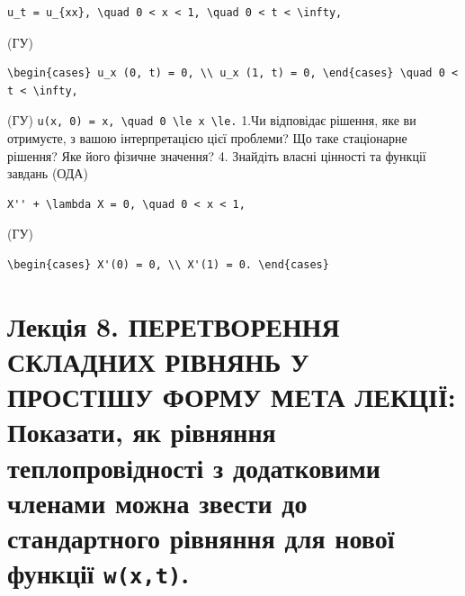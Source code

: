 \documentclass[
  ukrainian,
]{article}
\begin{document}
\begin{verbatim}
u_t = u_{xx}, \quad 0 < x < 1, \quad 0 < t < \infty,
\end{verbatim}

(ГУ)

\begin{verbatim}
\begin{cases} u_x (0, t) = 0, \\ u_x (1, t) = 0, \end{cases} \quad 0 < t < \infty,
\end{verbatim}

(ГУ)
\texttt{u(x,\ 0)\ =\ x,\ \textbackslash{}quad\ 0\ \textbackslash{}le\ x\ \textbackslash{}le.}
1.Чи відповідає рішення, яке ви отримуєте, з вашою інтерпретацією цієї
проблеми? Що таке стаціонарне рішення? Яке його фізичне значення? 4.
Знайдіть власні цінності та функції завдань (ОДА)

\begin{verbatim}
X'' + \lambda X = 0, \quad 0 < x < 1,
\end{verbatim}

(ГУ)

\begin{verbatim}
\begin{cases} X'(0) = 0, \\ X'(1) = 0. \end{cases}
\end{verbatim}

\section{\texorpdfstring{Лекція 8. ПЕРЕТВОРЕННЯ СКЛАДНИХ РІВНЯНЬ У
ПРОСТІШУ ФОРМУ МЕТА ЛЕКЦІЇ: Показати, як рівняння теплопровідності з
додатковими членами можна звести до стандартного рівняння для нової
функції
\texttt{w(x,t)}.}{Лекція 8. ПЕРЕТВОРЕННЯ СКЛАДНИХ РІВНЯНЬ У ПРОСТІШУ ФОРМУ МЕТА ЛЕКЦІЇ: Показати, як рівняння теплопровідності з додатковими членами можна звести до стандартного рівняння для нової функції w(x,t).}}\label{ux43bux435ux43aux446ux456ux44f-8.-ux43fux435ux440ux435ux442ux432ux43eux440ux435ux43dux43dux44f-ux441ux43aux43bux430ux434ux43dux438ux445-ux440ux456ux432ux43dux44fux43dux44c-ux443-ux43fux440ux43eux441ux442ux456ux448ux443-ux444ux43eux440ux43cux443-ux43cux435ux442ux430-ux43bux435ux43aux446ux456ux457-ux43fux43eux43aux430ux437ux430ux442ux438-ux44fux43a-ux440ux456ux432ux43dux44fux43dux43dux44f-ux442ux435ux43fux43bux43eux43fux440ux43eux432ux456ux434ux43dux43eux441ux442ux456-ux437-ux434ux43eux434ux430ux442ux43aux43eux432ux438ux43cux438-ux447ux43bux435ux43dux430ux43cux438-ux43cux43eux436ux43dux430-ux437ux432ux435ux441ux442ux438-ux434ux43e-ux441ux442ux430ux43dux434ux430ux440ux442ux43dux43eux433ux43e-ux440ux456ux432ux43dux44fux43dux43dux44f-ux434ux43bux44f-ux43dux43eux432ux43eux457-ux444ux443ux43dux43aux446ux456ux457-wxt.}
\end{document}
